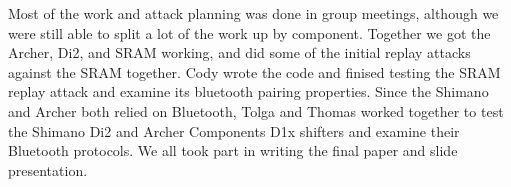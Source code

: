 \documentclass[letterpaper,twocolumn,10pt]{article}
\begin{document}
Most of the work and attack planning was done in group meetings, although we were still able to split a lot of the work up by component. Together we got the Archer, Di2, and SRAM working, and did some of the initial replay attacks against the SRAM together. Cody wrote the code and finised testing the SRAM replay attack and examine its bluetooth pairing properties. Since the Shimano and Archer both relied on Bluetooth, Tolga and Thomas worked together to test the Shimano Di2 and Archer Components D1x shifters and examine their Bluetooth protocols. We all took part in writing the final paper and slide presentation.

\end{document}
